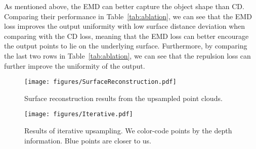 As mentioned above, the EMD can better capture the object shape than CD.
Comparing their performance in Table~\ref{tab:ablation}, we can see that the EMD loss improves the output uniformity with low surface distance deviation when comparing with the CD loss, meaning that the EMD loss can better encourage the output points to lie on the underlying surface. 
Furthermore, by comparing the last two rows in Table~\ref{tab:ablation}, we can see that the repulsion loss can further improve the uniformity of the output. 

\begin{table}
	\centering
	\caption{Architecture design analysis on our collect dataset.}
	\label{tab:ablation}
	\vspace{-5.5mm}
\end{table}



\begin{figure*}[t]
	\centering
	\texttt{[image: figures/SurfaceReconstruction.pdf]}\vspace{1mm}
	\vspace{-2mm}
	\caption{Surface reconstruction results from the upsampled point clouds.}
	\label{fig:surfacereconstruction}
	\vspace{-3.5mm}
\end{figure*} 

\begin{figure}[htbp]
	\centering
	\texttt{[image: figures/Iterative.pdf]}\vspace{1mm}
	\vspace{-1mm}
	\caption{Results of iterative upsampling. We color-code points by the depth information. Blue points are closer to us.}
	\label{fig:iterative}
\end{figure}

